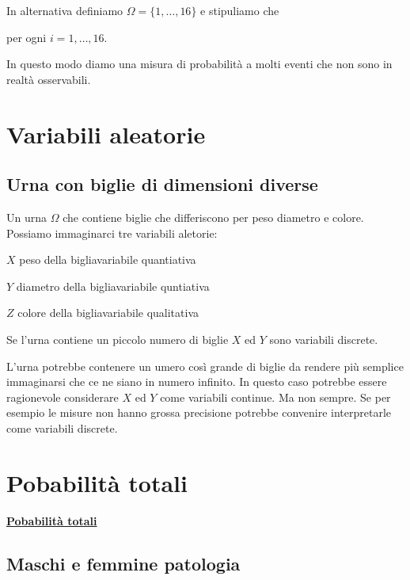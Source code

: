 \documentclass[11pt,openany]{book}
\begin{document}

In alternativa definiamo $\Omega=\{1,\dots,16\}$ e 
stipuliamo che 

\hfil per ogni $i=1,\dots,16$.





In questo modo diamo una misura di probabilità a molti eventi che non sono in realtà osservabili. 



\clearpage\section{Variabili aleatorie}

\subsection{Urna con biglie di dimensioni diverse}
\label{Urna_biglie_diverse}

Un urna $\Omega$ che contiene biglie che differiscono per peso diametro e colore. Possiamo immaginarci tre variabili aletorie:

$X$ peso della biglia\hfill variabile quantiativa

$Y$ diametro della biglia\hfill variabile quntiativa

$Z$ colore della biglia\hfill variabile qualitativa

Se l'urna contiene un piccolo numero di biglie $X$ ed $Y$ sono variabili discrete.

L'urna potrebbe contenere un umero così grande di biglie da rendere più semplice immaginarsi che ce ne siano in numero infinito. In questo caso potrebbe essere ragionevole considerare $X$ ed $Y$ come variabili continue. Ma non sempre. Se per esempio le misure non hanno grossa precisione potrebbe convenire interpretarle come variabili discrete.

\clearpage\section{Pobabilità totali}


\hfill\textbf{{\color{brown}\hyperref[TeoremaProbabilitaTotali]{Pobabilità totali} \faShare}}
\subsection{Maschi e femmine patologia}
\label{MF_totali}
\end{document}
